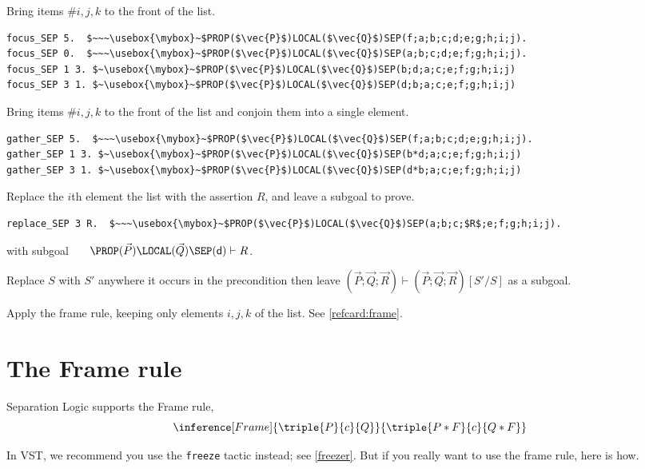 \documentclass[12pt,fleqn,openany,oneside,showtrims]{memoir}
\newcommand{\ychapter}[2]{\chapter[#1]{#1}}
\begin{document}
\begin{description}\setlength{\itemsep}{2ex}
\item[$\mathsf{focus\_SEP}~i~j~k$.]
Bring items \#$i,j,k$ to the front of the \SEP{} list.
\begin{lstlisting}
focus_SEP 5.  $~~~\usebox{\mybox}~$PROP($\vec{P}$)LOCAL($\vec{Q}$)SEP(f;a;b;c;d;e;g;h;i;j).
focus_SEP 0.  $~~~\usebox{\mybox}~$PROP($\vec{P}$)LOCAL($\vec{Q}$)SEP(a;b;c;d;e;f;g;h;i;j).
focus_SEP 1 3. $~\usebox{\mybox}~$PROP($\vec{P}$)LOCAL($\vec{Q}$)SEP(b;d;a;c;e;f;g;h;i;j)
focus_SEP 3 1. $~\usebox{\mybox}~$PROP($\vec{P}$)LOCAL($\vec{Q}$)SEP(d;b;a;c;e;f;g;h;i;j)
\end{lstlisting}
\item[$\mathsf{gather\_SEP}~i~j~k$.]
Bring items \#$i,j,k$ to the front of the \SEP{} list
and conjoin them into a single element.
\begin{lstlisting}
gather_SEP 5.  $~~~\usebox{\mybox}~$PROP($\vec{P}$)LOCAL($\vec{Q}$)SEP(f;a;b;c;d;e;g;h;i;j).
gather_SEP 1 3. $~\usebox{\mybox}~$PROP($\vec{P}$)LOCAL($\vec{Q}$)SEP(b*d;a;c;e;f;g;h;i;j)
gather_SEP 3 1. $~\usebox{\mybox}~$PROP($\vec{P}$)LOCAL($\vec{Q}$)SEP(d*b;a;c;e;f;g;h;i;j)
\end{lstlisting}
\item[$\mathsf{replace\_SEP}~i~R$.]
Replace the $i$th element the \SEP{} list
with the assertion $R$, and leave a subgoal to prove.
\begin{lstlisting}
replace_SEP 3 R.  $~~~\usebox{\mybox}~$PROP($\vec{P}$)LOCAL($\vec{Q}$)SEP(a;b;c;$R$;e;f;g;h;i;j).
\end{lstlisting}
with subgoal~~~ $\PROP(\vec{P})\LOCAL(\vec{Q})\SEP(\textsf{d}) \vdash R$.
\item[$\mathsf{replace\_in\_pre}~S~S'$.]
Replace $S$ with $S'$ anywhere it occurs in the precondition
then leave
$(\vec{P};\vec{Q};\vec{R}) \vdash (\vec{P};\vec{Q};\vec{R})[S'/S]$
as a subgoal.
\item[$\mathsf{frame\_SEP}~i~j~k.$]
Apply the frame rule, keeping only
elements $i,j,k$ of the \SEP{} list.  See \autoref{refcard:frame}.
\end{description}

\ychapter{The Frame rule}{}
\label{refcard:frame}

Separation Logic supports the Frame rule,
\[\inference[Frame]{\triple{P}{c}{Q}}{\triple{P*F}{c}{Q*F}}\]

In VST, we recommend you use the \lstinline{freeze} tactic instead; see \autoref{freezer}.  But if you really want to use the frame rule, here is how.
\end{document}
